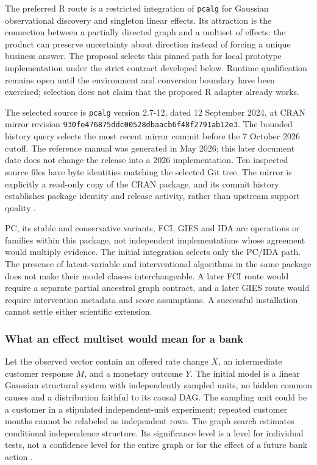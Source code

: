 \label{exec13:pcalg-reuse}

The preferred R route is a restricted integration of \texttt{pcalg} for
Gaussian observational discovery and singleton linear effects. Its
attraction is the connection between a partially directed graph and a
multiset of effects: the product can preserve uncertainty about
direction instead of forcing a unique business answer. The proposal
selects this pinned path for local prototype implementation under the
strict contract developed below. Runtime qualification remains open
until the environment and conversion boundary have been exercised;
selection does not claim that the proposed R adapter already works.

The selected source is \texttt{pcalg} version 2.7-12, dated 12 September
2024, at CRAN mirror revision
\texttt{930fe476875ddc00528dbaacb6f48f2791ab12e3}. The bounded history
query selects the most recent mirror commit before the 7 October 2026
cutoff. The reference manual was generated in May 2026; this later
document date does not change the release into a 2026 implementation.
Ten inspected source files have byte identities matching the selected
Git tree. The mirror is explicitly a read-only copy of the CRAN package,
and its commit history establishes package identity and release
activity, rather than upstream support quality
\citep{exec13_pcalg,exec13_pcalg_reuse_primary}.

PC, its stable and conservative variants, FCI, GIES and IDA are
operations or families within this package, not independent
implementations whose agreement would multiply evidence. The initial
integration selects only the PC/IDA path. The presence of
latent-variable and interventional algorithms in the same package does
not make their model classes interchangeable. A later FCI route would
require a separate partial ancestral graph contract, and a later GIES
route would require intervention metadata and score assumptions. A
successful installation cannot settle either scientific extension.

\hypertarget{what-an-effect-multiset-would-mean-for-a-bank}{%
\subsubsection{What an effect multiset would mean for a
bank}\label{what-an-effect-multiset-would-mean-for-a-bank}}

Let the observed vector contain an offered rate change \(X\), an
intermediate customer response \(M\), and a monetary outcome \(Y\). The
initial model is a linear Gaussian structural system with independently
sampled units, no hidden common causes and a distribution faithful to
its causal DAG. The sampling unit could be a customer in a stipulated
independent-unit experiment; repeated customer months cannot be
relabeled as independent rows. The graph search estimates conditional
independence structure. Its significance level is a level for individual
tests, not a confidence level for the entire graph or for the effect of
a future bank action \citep{exec13_pcalg}.

